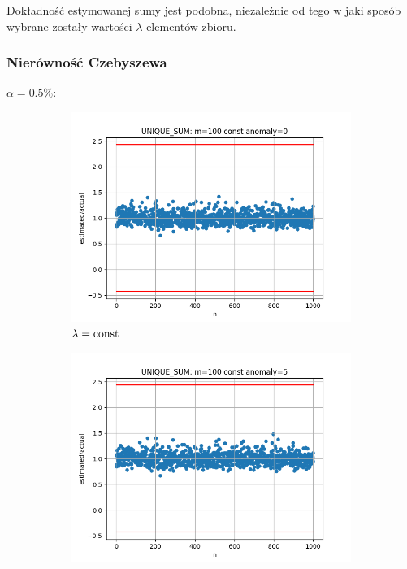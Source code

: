\documentclass{article}
\begin{document}
    Dokładność estymowanej sumy jest podobna, niezależnie od tego w jaki sposób wybrane 
    zostały wartości $\lambda$ elementów zbioru.

    \subsubsection{Nierówność Czebyszewa}

    $\alpha = 0.5\%$:

    \begin{figure}[H]
        \begin{subfigure}{0.6\textwidth}
            \centering
            \includegraphics[width=\linewidth]{sum/zad1_const_0_cheb_05.png}
            \caption{$\lambda = \textnormal{const}$}
        \end{subfigure}
        \begin{subfigure}{0.6\textwidth}
            \centering
            \includegraphics[width=\linewidth]{sum/zad1_const_5_cheb_05.png}

\end{subfigure}
\end{figure}
\end{document}
